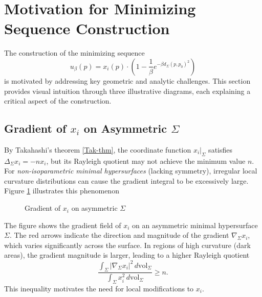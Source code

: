 \documentclass[a4, 12pt]{amsart}
\numberwithin{equation}{section} \numberwithin{equation}{section}
\begin{document}
\section{Motivation for Minimizing Sequence Construction}\label{section: motivation}

The construction of the minimizing sequence \begin{equation*} u_\beta(p) = x_i(p) \cdot \left(1- \frac{1}{\beta} e^{-\beta d_\Sigma(p, p_0)^2}\right) \end{equation*} is motivated by addressing key geometric and analytic challenges. This section provides visual intuition through three illustrative diagrams, each explaining a critical aspect of the construction.

\subsection{Gradient of $ x_i $ on Asymmetric $ \Sigma $}

By Takahashi's theorem \ref{Tak-thm}, the coordinate function $ x_i|_\Sigma $ satisfies $ \Delta_\Sigma x_i = -n x_i $, but its Rayleigh quotient may not achieve the minimum value $ n $. For \textit{non-isoparametric minimal hypersurfaces} (lacking symmetry), irregular local curvature distributions can cause the gradient integral to be excessively large. Figure \ref{fig:xi-gradient} illustrates this phenomenon

\begin{figure}[h!]
    \centering
    \caption{Gradient of $ x_i $ on asymmetric $ \Sigma $}
    \label{fig:xi-gradient}
\end{figure}

The figure shows the gradient field of $ x_i $ on an asymmetric minimal hypersurface $ \Sigma $. The red arrows indicate the direction and magnitude of the gradient $ \nabla_\Sigma x_i $, which varies significantly across the surface. In regions of high curvature (dark areas), the gradient magnitude is larger, leading to a higher Rayleigh quotient
\begin{equation*}
\frac{\int_\Sigma |\nabla_\Sigma x_i|^2 \, d\mathrm{vol}_\Sigma}{\int_\Sigma x_i^2 \, d\mathrm{vol}_\Sigma} \geq n.
\end{equation*}
This inequality motivates the need for local modifications to $ x_i $.
\end{document}
